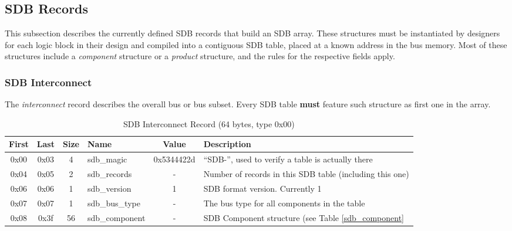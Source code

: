 \documentclass[a4paper, 12pt]{article}
\begin{document}
\subsection{SDB Records}

This subsection describes the currently defined SDB records that build an SDB array.
These
structures must be instantiated by designers for each logic block in their design and compiled into
a contiguous SDB table, placed at a known address in the bus memory.  Most of these structures
include a \textit{component} structure or a \textit{product} structure, and the rules for the
respective fields apply.

\subsubsection{SDB Interconnect}

The \textit{interconnect} record describes the overall bus or bus subset. Every
SDB table \textbf{must} feature such structure as first one in the array.

\begin{center}
  \begin{savenotes}
    \begin{table}[!ht]\footnotesize
      \caption{SDB Interconnect Record (64 bytes, type 0x00)}\label{sdb_interconnect}\centering
        \begin{tabular}{| c | c | c | l | c | p{4cm} |} \hline
        First & Last & Size & Name & Value & Description \\ \hline
        0x00 & 0x03 & 4 & sdb\_magic & 0x5344422d & ``SDB-'', used to verify a table is actually there \\ \hline
        0x04 & 0x05 & 2 & sdb\_records & - & Number of records in this SDB table (including this one) \\ \hline
        0x06 & 0x06 & 1 & sdb\_version & 1 & SDB format version. Currently 1 \\ \hline
        0x07 & 0x07 & 1 & sdb\_bus\_type & - & The bus type for all components in the table \\ \hline
        0x08 & 0x3f & 56 & sdb\_component & - & SDB Component structure (see Table \ref{sdb_component} \\ \hline
        \end{tabular}
    \end{table}
  \end{savenotes}
\end{center}
\end{document}
